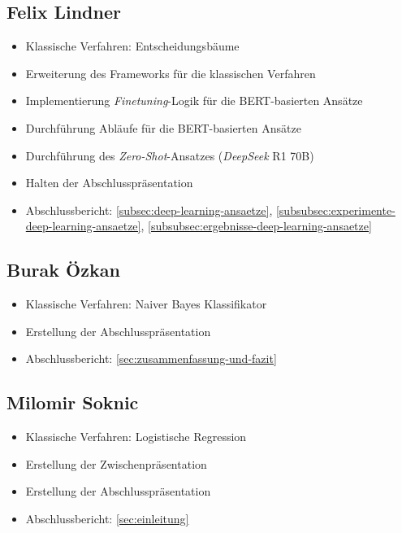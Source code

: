 \begin{multicols}{2}
\subsection{Felix Lindner}
\begin{itemize}
    \item Klassische Verfahren: Entscheidungsbäume
    \item Erweiterung des Frameworks für die klassischen Verfahren
    \item Implementierung \textit{Finetuning}-Logik für die BERT-basierten Ansätze
    \item Durchführung Abläufe für die BERT-basierten Ansätze
    \item Durchführung des \textit{Zero-Shot}-Ansatzes (\textit{DeepSeek} R1 70B)
    \item Halten der Abschlusspräsentation
    \item Abschlussbericht: \ref{subsec:deep-learning-ansaetze}, \ref{subsubsec:experimente-deep-learning-ansaetze}, \ref{subsubsec:ergebnisse-deep-learning-ansaetze}
\end{itemize}

\subsection{Burak Özkan}
\begin{itemize}
    \item Klassische Verfahren: Naiver Bayes Klassifikator
    \item Erstellung der Abschlusspräsentation
    \item Abschlussbericht: \ref{sec:zusammenfassung-und-fazit}
\end{itemize}

\subsection{Milomir Soknic}
\begin{itemize}
    \item Klassische Verfahren: Logistische Regression
    \item Erstellung der Zwischenpräsentation
    \item Erstellung der Abschlusspräsentation
    \item Abschlussbericht: \ref{sec:einleitung}
\end{itemize}

\end{multicols}
